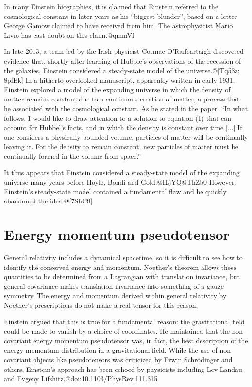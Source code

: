 \documentclass[twoside]{memoir}
\begin{document}
In many Einstein biographies, it is claimed that Einstein referred to the cosmological constant in later years as his \enquote{biggest blunder}, based on a letter George Gamow claimed to have received from him. The astrophysicist Mario Livio has cast doubt on this claim.@qmmVf

In late 2013, a team led by the Irish physicist Cormac O'Raifeartaigh discovered evidence that, shortly after learning of Hubble's observations of the recession of the galaxies, Einstein considered a steady-state model of the universe.@[Tq53z; 8pfEk] In a hitherto overlooked manuscript, apparently written in early 1931, Einstein explored a model of the expanding universe in which the density of matter remains constant due to a continuous creation of matter, a process that he associated with the cosmological constant. As he stated in the paper, \enquote{In what follows, I would like to draw attention to a solution to equation (1) that can account for Hubbel's facts, and in which the density is constant over time [...] If one considers a physically bounded volume, particles of matter will be continually leaving it. For the density to remain constant, new particles of matter must be continually formed in the volume from space.}

It thus appears that Einstein considered a steady-state model of the expanding universe many years before Hoyle, Bondi and Gold.@ILjYQ@ThZb0 However, Einstein's steady-state model contained a fundamental flaw and he quickly abandoned the idea.@[7ShC9]
\section{Energy momentum pseudotensor}
General relativity includes a dynamical spacetime, so it is difficult to see how to identify the conserved energy and momentum. Noether's theorem allows these quantities to be determined from a Lagrangian with translation invariance, but general covariance makes translation invariance into something of a gauge symmetry. The energy and momentum derived within general relativity by Noether's prescriptions do not make a real tensor for this reason.

Einstein argued that this is true for a fundamental reason: the gravitational field could be made to vanish by a choice of coordinates. He maintained that the non-covariant energy momentum pseudotensor was, in fact, the best description of the energy momentum distribution in a gravitational field. While the use of non-covariant objects like pseudotensors was criticized by Erwin Schrödinger and others, Einstein's approach has been echoed by physicists including Lev Landau and Evgeny Lifshitz.@doi:10.1103/PhysRev.111.315
\end{document}
